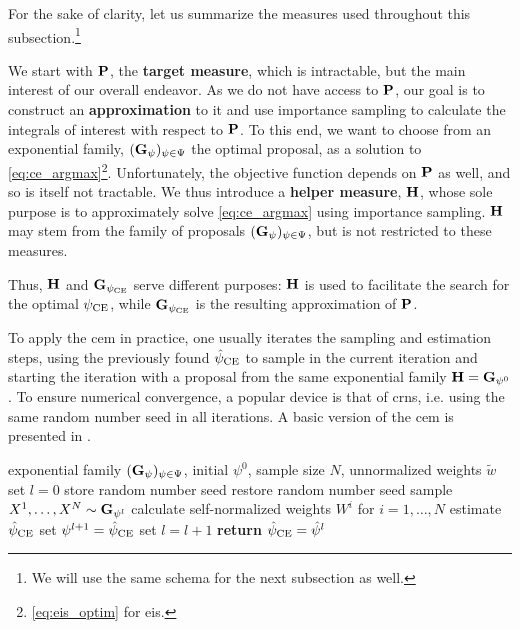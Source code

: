 \begin{remark}
    \label{rem:measures_in_is}
    For the sake of clarity, let us summarize the measures used throughout this subsection.\footnote{We will use the same schema for the next subsection as well.}

    We start with $\P$, the \textbf{target measure}, which is intractable, but the main interest of our overall endeavor. As we do not have access to $\P$, our goal is to construct an \textbf{approximation} to it and use importance sampling to calculate the integrals of interest with respect to $\P$. To this end, we want to choose from an exponential family, $(\G_{\psi})_{\psi \in \Psi}$ the optimal proposal, as a solution to \eqref{eq:ce_argmax}\footnote{\eqref{eq:eis_optim} for \gls{eis}.}. Unfortunately, the objective function depends on $\P$ as well, and so is itself not tractable. We thus introduce a \textbf{helper measure}, $\H$, whose sole purpose is to approximately solve \eqref{eq:ce_argmax} using importance sampling. $\H$ may stem from the family of proposals $(\G_{\psi})_{\psi \in \Psi}$, but is not restricted to these measures. 

    Thus, $\H$ and $\G_{\pce}$ serve different purposes: $\H$ is used to facilitate the search for the optimal $\pce$, while $\G_{\pce}$ is the resulting approximation of $\P$.
\end{remark}


To apply the \gls{cem} in practice, one usually iterates the sampling and estimation steps, using the previously found $\hpce$ to sample in the current iteration and starting the iteration with a proposal from the same exponential family $\H = \G_{\psi^{0}}$. To ensure numerical convergence, a popular device is that of \glspl{crn}, i.e. using the same random number seed in all iterations. A basic version of the \gls{cem} is presented in .

\begin{algorithm}
    \caption{The basic \gls{cem} algorithm for exponential families}
    \label{alg:cem-basic}
    \begin{algorithmic}[1]
        \Require exponential family $(\G_{\psi})_{\psi \in\Psi}$, initial $\psi^{0}$, sample size $N$, unnormalized weights $\tilde w$
        \State set $l = 0$
        \State store random number seed
        \Repeat
            \State restore random number seed
            \State sample $X^{1}, \dots, X^{N} \sim \G_{\psi^{l}}$
            \State calculate self-normalized weights $W^{i}$ for $i = 1, \dots, N$ 
            \State estimate $\hpce$ \Comment{\eqref{eq:ee_hpce}}
            \State set $\psi^{l + 1} = \hpce$
            \State set $l = l + 1$
        \State \textbf{return} $\hpce = \hat\psi^{l}$
    \end{algorithmic}
\end{algorithm}

